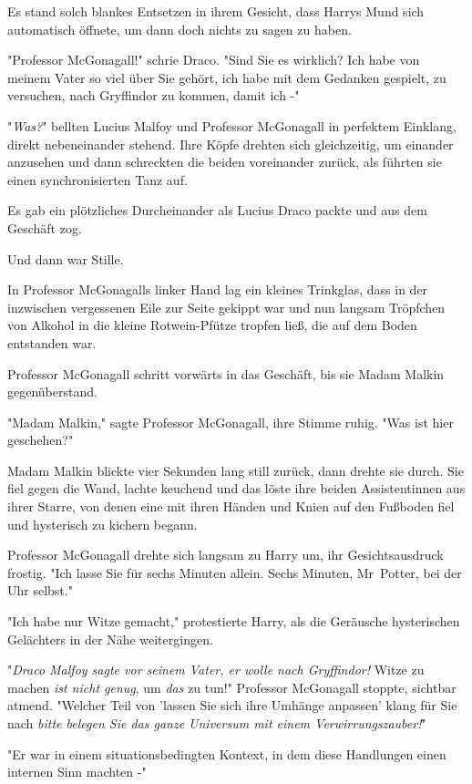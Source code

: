 {Es stand solch blankes Entsetzen in ihrem Gesicht, dass Harrys Mund sich automatisch öffnete, um dann doch nichts zu sagen zu haben.

"Professor McGonagall!" schrie Draco. "Sind Sie es wirklich? Ich habe von meinem Vater so viel über Sie gehört, ich habe mit dem Gedanken gespielt, zu versuchen, nach Gryffindor zu kommen, damit ich -"

"\emph{Was?}" bellten Lucius Malfoy und Professor McGonagall in perfektem Einklang, direkt nebeneinander stehend. Ihre Köpfe drehten sich gleichzeitig, um einander anzusehen und dann schreckten die beiden voreinander zurück, als führten sie einen synchronisierten Tanz auf.

Es gab ein plötzliches Durcheinander als Lucius Draco packte und aus dem Geschäft zog.

Und dann war Stille.

In Professor McGonagalls linker Hand lag ein kleines Trinkglas, dass in der inzwischen vergessenen Eile zur Seite gekippt war und nun langsam Tröpfchen von Alkohol in die kleine Rotwein-Pfütze tropfen ließ, die auf dem Boden entstanden war.

Professor McGonagall schritt vorwärts in das Geschäft, bis sie Madam Malkin gegenüberstand.

"Madam Malkin," sagte Professor McGonagall, ihre Stimme ruhig. "Was ist hier geschehen?"

Madam Malkin blickte vier Sekunden lang still zurück, dann drehte sie durch. Sie fiel gegen die Wand, lachte keuchend und das löste ihre beiden Assistentinnen aus ihrer Starre, von denen eine mit ihren Händen und Knien auf den Fußboden fiel und hysterisch zu kichern begann.

Professor McGonagall drehte sich langsam zu Harry um, ihr Gesichtsausdruck frostig. "Ich lasse Sie für sechs Minuten allein. Sechs Minuten, Mr~Potter, bei der Uhr selbst."

"Ich habe nur Witze gemacht," protestierte Harry, als die Geräusche hysterischen Gelächters in der Nähe weitergingen.

"\emph{Draco Malfoy sagte vor seinem Vater, er wolle nach Gryffindor!} Witze zu machen \emph{ist nicht genug}, um \emph{das} zu tun!" Professor McGonagall stoppte, sichtbar atmend. "Welcher Teil von 'lassen Sie sich ihre Umhänge anpassen' klang für Sie nach \emph{bitte belegen Sie das ganze Universum mit einem Verwirrungszauber!}"

"Er war in einem situationsbedingten Kontext, in dem diese Handlungen einen internen Sinn machten -"

}
